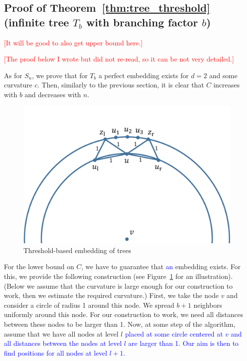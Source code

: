 \documentclass{article} %
\newcommand{\ph}[1]{\textcolor{blue}{#1}}
\begin{document}

\subsection{Proof of Theorem~\ref{thm:tree_threshold} (infinite tree $T_b$ with branching factor $b$)}

\textcolor{red}{[It will be good to also get upper bound here.]}

\textcolor{red}{[The proof below I wrote but did not re-read, so it can be not very detailed.]}

As for $S_n$, we prove that for $T_b$ a perfect embedding exists for $d = 2$ and some curvature $c$. Then, similarly to the previous section, it is clear that $C$ increases with $b$ and decreases with $n$.


\begin{figure}
    \centering
    \includegraphics[width = 0.5 \textwidth]{trees.pdf}
    \caption{Threshold-based embedding of trees}
    \label{fig:trees}
\end{figure}


For the lower bound on $C$, we have to guarantee that \ph{an} embedding exists. For this, we provide the following construction (see Figure~\ref{fig:trees} for an illustration).
(Below we assume that the curvature is large enough for our construction to work, then we estimate the required curvature.)
First, we take the node $v$ and consider a circle of radius 1 around this node. 
We spread $b + 1$ neighbors uniformly around this node. For our construction to work, we need all distances between these nodes to be larger than 1.
Now, at some step of the algorithm, assume that we have all nodes at level $l$ \ph{placed at some circle centered at $v$ and all distances between the nodes at level $l$ are larger than 1. Our aim is then to find positions for all nodes at level $l + 1$.} 
\end{document}
